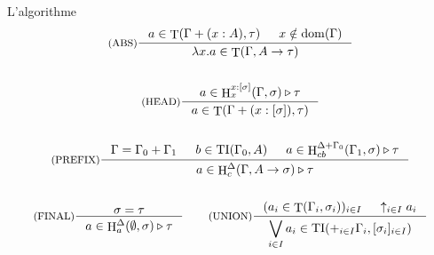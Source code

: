 \documentclass{beamer}
\DeclareMathOperator{\iT}{T}
\DeclareMathOperator{\iH}{H}
\DeclareMathOperator{\iTI}{TI}
\DeclareMathOperator{\iDom}{dom}
\begin{document}
%    
    
    \begin{frame}{L'algorithme}
        \begin{gather*}
        \inference[(ABS)]{a \in \iT(\Gamma + (x : A), \tau) & x \notin \iDom(\Gamma)}{\lambda x.a \in \iT(\Gamma, A \rightarrow \tau)}
        \\ \\
        \inference[(HEAD)]{a \in \iH^{x:[\sigma]}_x(\Gamma, \sigma) \triangleright \tau}{a \in\iT(\Gamma + (x:[\sigma]), \tau) }
        \\ \\
        \inference[(PREFIX)]{\Gamma = \Gamma_0 + \Gamma_1 & b \in \iTI(\Gamma_0, A) & a \in \iH^{\Delta + \Gamma_0}_{cb}(\Gamma_1, \sigma) \triangleright \tau}{a \in \iH^{\Delta}_c(\Gamma, A \rightarrow \sigma) \triangleright \tau}
        \\ \\
        \inference[(FINAL)]{\sigma = \tau}{a \in \iH^{\Delta}_a(\emptyset, \sigma) \triangleright \tau}
        \qquad
        \inference[(UNION)]{(a_i \in \iT(\Gamma_i, \sigma_i))_{i \in I} & \uparrow_{i \in I}a_i}{\displaystyle \bigvee_{i \in I} a_i \in \iTI(+_{i \in I}\Gamma_i, [\sigma_i]_{i \in I}) }
        \end{gather*}
    \end{frame}
    
\end{document}
